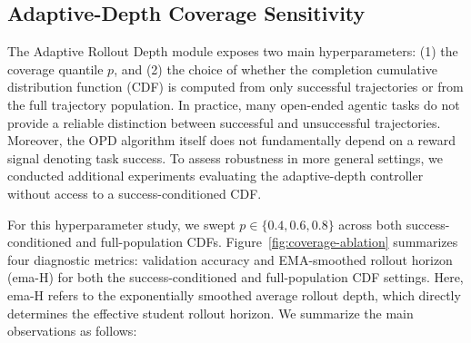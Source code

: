 \begin{table}[htbp]
\centering
\caption{
Impact of KL normalization strategies on ALFWorld-1.7B. ``Same-Step Avg@4'' is the mean over the last four evaluation checkpoints. ``Deep budget'' gives the KL budget assigned to the deepest third of valid turns in early/mid/late training. ``$\alpha$'' is the blend coefficient, with $\alpha=0$ for trajectory-level KL and $\alpha=1$ for hard turn-level KL.
}
\label{tab:abl-turnnorm}
\small
\setlength{\tabcolsep}{4pt}
\end{table}

\subsection{Adaptive-Depth Coverage Sensitivity}
\label{sec:exp:coverage-sensitivity}

The Adaptive Rollout Depth module exposes two main hyperparameters: (1) the coverage quantile $p$, and (2) the choice of whether the completion cumulative distribution function (CDF) is computed from only successful trajectories or from the full trajectory population. In practice, many open-ended agentic tasks do not provide a reliable distinction between successful and unsuccessful trajectories. Moreover, the OPD algorithm itself does not fundamentally depend on a reward signal denoting task success. To assess robustness in more general settings, we conducted additional experiments evaluating the adaptive-depth controller without access to a success-conditioned CDF.

For this hyperparameter study, we swept $p\in\{0.4, 0.6, 0.8\}$ across both success-conditioned and full-population CDFs. Figure~\ref{fig:coverage-ablation} summarizes four diagnostic metrics: validation accuracy and EMA-smoothed rollout horizon (ema-H) for both the success-conditioned and full-population CDF settings. Here, ema-H refers to the exponentially smoothed average rollout depth, which directly determines the effective student rollout horizon. We summarize the main observations as follows:

